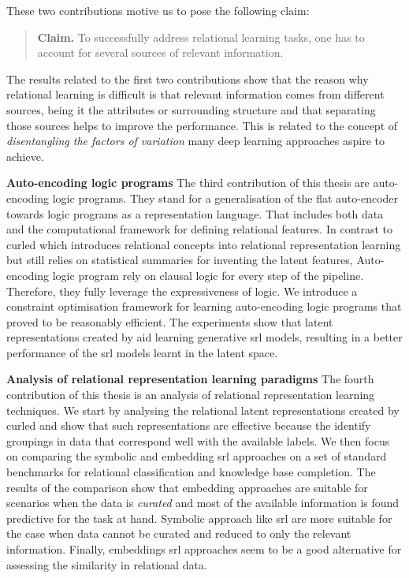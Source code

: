 These two contributions motive us to pose the following claim:

\begin{quote}
	\textbf{Claim.} To successfully address relational learning tasks, one has to account for several sources of relevant information.

\end{quote}


The results related to the first two contributions show that the reason why relational learning is difficult is that relevant information comes from different sources, being it the attributes or surrounding structure and that separating those sources helps to improve the performance.
This is related to the concept of \textit{disentangling the factors of variation} many deep learning approaches aspire to achieve.




\textbf{Auto-encoding logic programs}
The third contribution of this thesis are auto-encoding logic programs.
They stand for a generalisation of the flat auto-encoder towards logic programs as a representation language.
That includes both data and the computational framework for defining relational features.
In contrast to \gls{curled} which introduces relational concepts into relational representation learning but still relies on statistical summaries for inventing the latent features, Auto-encoding logic program rely on clausal logic for every step of the pipeline.
Therefore, they fully leverage the expressiveness of logic.
We introduce a constraint optimisation framework for learning auto-encoding logic programs that proved to be reasonably efficient.
The experiments show that latent representations created by \alp{} aid learning generative \gls{srl} models, resulting in a better performance of the \gls{srl} models learnt in the latent space.







\textbf{Analysis of relational representation learning paradigms}
The fourth contribution of this thesis is an analysis of relational representation learning techniques.
We start by analysing the relational latent representations created by \gls{curled} and show that such representations are effective because the identify groupings in data that correspond well with the available labels.
We then focus on comparing the symbolic and embedding \gls{srl} approaches on a set of standard benchmarks for relational classification and knowledge base completion.
The results of the comparison show that embedding approaches are suitable for scenarios when the data is \textit{curated} and most of the available information is found predictive for the task at hand.
Symbolic approach like \gls{srl} are more suitable for the case when data cannot be curated and reduced to only the relevant information.
Finally, embeddings \gls{srl} approaches seem to be a good alternative for assessing the similarity in relational data.



